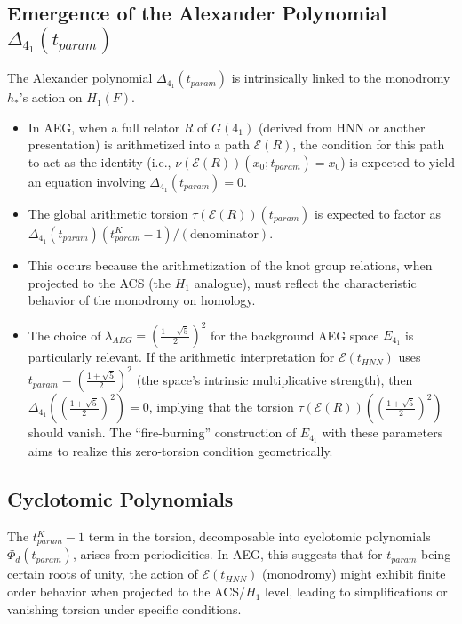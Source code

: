\documentclass[12pt, a4paper]{article}
\begin{document}
\subsection{Emergence of the Alexander Polynomial $\Delta_{4_1}(t_{param})$}
The Alexander polynomial $\Delta_{4_1}(t_{param})$ is intrinsically linked to the monodromy $h_*$'s action on $H_1(F)$.
\begin{itemize}
    \item In AEG, when a full relator $R$ of $G(4_1)$ (derived from HNN or another presentation) is arithmetized into a path $\mathcal{E}(R)$, the condition for this path to act as the identity (i.e., $\nu(\mathcal{E}(R))(x_0; t_{param}) = x_0$) is expected to yield an equation involving $\Delta_{4_1}(t_{param})=0$.
    \item The global arithmetic torsion $\tau(\mathcal{E}(R))(t_{param})$ is expected to factor as $\Delta_{4_1}(t_{param})(t_{param}^K-1) / (\text{denominator})$.
    \item This occurs because the arithmetization of the knot group relations, when projected to the ACS (the $H_1$ analogue), must reflect the characteristic behavior of the monodromy on homology.
    \item The choice of $\lambda_{AEG} = \left(\frac{1+\sqrt{5}}{2}\right)^2$ for the background AEG space $E_{4_1}$ is particularly relevant. If the arithmetic interpretation for $\mathcal{E}(t_{HNN})$ uses $t_{param} = \left(\frac{1+\sqrt{5}}{2}\right)^2$ (the space's intrinsic multiplicative strength), then $\Delta_{4_1}(\left(\frac{1+\sqrt{5}}{2}\right)^2)=0$, implying that the torsion $\tau(\mathcal{E}(R))(\left(\frac{1+\sqrt{5}}{2}\right)^2)$ should vanish. The ``fire-burning'' construction of $E_{4_1}$ with these parameters aims to realize this zero-torsion condition geometrically.
\end{itemize}

\subsection{Cyclotomic Polynomials}
The $t_{param}^K-1$ term in the torsion, decomposable into cyclotomic polynomials $\Phi_d(t_{param})$, arises from periodicities. In AEG, this suggests that for $t_{param}$ being certain roots of unity, the action of $\mathcal{E}(t_{HNN})$ (monodromy) might exhibit finite order behavior when projected to the ACS/$H_1$ level, leading to simplifications or vanishing torsion under specific conditions.
\end{document}
